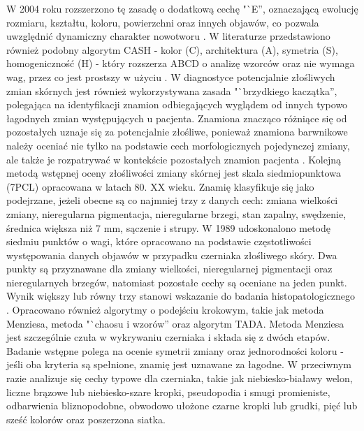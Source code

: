 W 2004 roku rozszerzono tę zasadę o dodatkową cechę "`E'', oznaczającą ewolucję rozmiaru, kształtu, koloru, powierzchni oraz innych objawów, co pozwala uwzględnić dynamiczny charakter nowotworu \cite{Abbasi_Shaw_Rigel_Friedman_McCarthy_Osman_Kopf_Polsky_2004, Duarte_Sousa-Pinto_Azevedo_Barros_Puig_Malvehy_Haneke_Correia_2021}.
W literaturze przedstawiono również podobny algorytm CASH - kolor (C), architektura (A), symetria (S), homogeniczność (H) - który rozszerza ABCD o analizę wzorców oraz nie wymaga wag, przez co jest prostszy w użyciu \cite{Henning_Stein_Yeung_Dusza_Marghoob_Rabinovitz_Polsky_Kopf_2008}.
W diagnostyce potencjalnie złośliwych zmian skórnych jest również wykorzystywana zasada "`brzydkiego kaczątka'', polegająca na identyfikacji znamion odbiegających wyglądem od innych typowo łagodnych zmian występujących u pacjenta.
Znamiona znacząco różniące się od pozostałych uznaje się za potencjalnie złośliwe, ponieważ znamiona barwnikowe należy oceniać nie tylko na podstawie cech morfologicznych pojedynczej zmiany, ale także je rozpatrywać w kontekście pozostałych znamion pacjenta \cite{Grob_Bonerandi_1998, dermatoscopy-kamiska-wiciorek-spiewak}.
Kolejną metodą wstępnej oceny złośliwości zmiany skórnej jest skala siedmiopunktowa (7PCL) opracowana w latach 80. XX wieku.
Znamię klasyfikuje się jako podejrzane, jeżeli obecne są co najmniej trzy z danych cech: zmiana wielkości zmiany, nieregularna pigmentacja, nieregularne brzegi, stan zapalny, swędzenie, średnica większa niż 7 mm, sączenie i strupy.
W 1989 udoskonalono metodę siedmiu punktów o wagi, które opracowano na podstawie częstotliwości występowania danych objawów w przypadku czerniaka złośliwego skóry.
Dwa punkty są przyznawane dla zmiany wielkości, nieregularnej pigmentacji oraz nieregularnych brzegów, natomiast pozostałe cechy są oceniane na jeden punkt.
Wynik większy lub równy trzy stanowi wskazanie do badania histopatologicznego \cite{mackie1989malignant, MacKie_1990, Walter_Prevost_Vasconcelos_Hall_Burrows_Morris_Kinmonth_Emery_2013, Congdon_Davis_2023}.
Opracowano również algorytmy o podejściu krokowym, takie jak metoda Menziesa, metoda "`chaosu i wzorów'' oraz algorytm TADA.
Metoda Menziesa jest szczególnie czuła w wykrywaniu czerniaka i składa się z dwóch etapów.
Badanie wstępne polega na ocenie symetrii zmiany oraz jednorodności koloru - jeśli oba kryteria są spełnione, znamię jest uznawane za łagodne.
W przeciwnym razie analizuje się cechy typowe dla czerniaka, takie jak niebiesko-białawy welon, liczne brązowe lub niebiesko-szare kropki, pseudopodia i smugi promieniste, odbarwienia bliznopodobne, obwodowo ułożone czarne kropki lub grudki, pięć lub sześć kolorów oraz poszerzona siatka.
